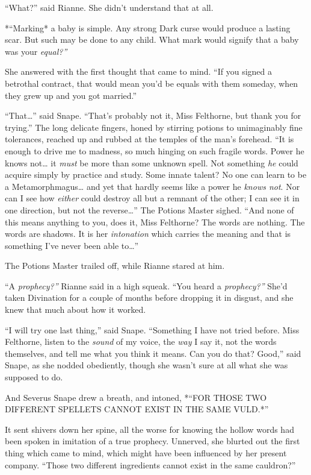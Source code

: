 ``What?'' said Rianne. She didn't understand that at all.

*``Marking* a baby is simple. Any strong Dark curse would produce a
lasting scar. But such may be done to any child. What mark would signify
that a baby was your \emph{equal?''}

She answered with the first thought that came to mind. ``If you signed a
betrothal contract, that would mean you'd be equals with them someday,
when they grew up and you got married.''

``That\ldots{}'' said Snape. ``That's probably not it, Miss Felthorne,
but thank you for trying.'' The long delicate fingers, honed by stirring
potions to unimaginably fine tolerances, reached up and rubbed at the
temples of the man's forehead. ``It is enough to drive me to madness, so
much hinging on such fragile words. Power he knows not\ldots{} it
\emph{must} be more than some unknown spell. Not something \emph{he}
could acquire simply by practice and study. Some innate talent? No one
can learn to be a Metamorphmagus\ldots{} and yet that hardly seems like
a power he \emph{knows not}. Nor can I see how \emph{either} could
destroy all but a remnant of the other; I can see it in one direction,
but not the reverse\ldots{}'' The Potions Master sighed. ``And none of
this means anything to you, does it, Miss Felthorne? The words are
nothing. The words are shadows. It is her \emph{intonation} which
carries the meaning and that is something I've never been able
to\ldots{}''

The Potions Master trailed off, while Rianne stared at him.

``A \emph{prophecy?''} Rianne said in a high squeak. ``You heard a
\emph{prophecy?''} She'd taken Divination for a couple of months before
dropping it in disgust, and she knew that much about how it worked.

``I will try one last thing,'' said Snape. ``Something I have not tried
before. Miss Felthorne, listen to the \emph{sound} of my voice, the
\emph{way} I say it, not the words themselves, and tell me what you
think it means. Can you do that? Good,'' said Snape, as she nodded
obediently, though she wasn't sure at all what she was supposed to do.

And Severus Snape drew a breath, and intoned, *``FOR THOSE TWO DIFFERENT
SPELLETS CANNOT EXIST IN THE SAME VULD.*''

It sent shivers down her spine, all the worse for knowing the hollow
words had been spoken in imitation of a true prophecy. Unnerved, she
blurted out the first thing which came to mind, which might have been
influenced by her present company. ``Those two different ingredients
cannot exist in the same cauldron?''

